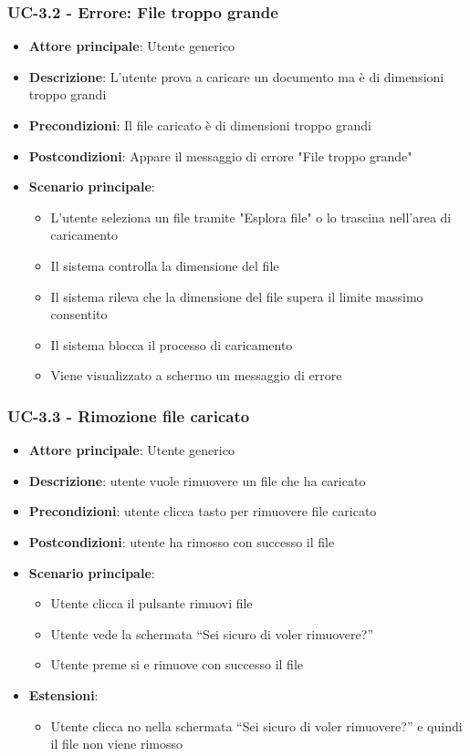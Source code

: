 \documentclass[11pt,a4paper]{article}
\begin{document}
\subsubsection{UC-3.2 - Errore: File troppo grande}
\begin{itemize}
    \item \textbf{Attore principale}: Utente generico
    \item \textbf{Descrizione}: L'utente prova a caricare un documento ma è di dimensioni troppo grandi
    \item \textbf{Precondizioni}: Il file caricato è di dimensioni troppo grandi
    \item \textbf{Postcondizioni}: Appare il messaggio di errore "File troppo grande"
    \item \textbf{Scenario principale}:
        \begin{itemize}
            \item L'utente seleziona un file tramite "Esplora file" o lo trascina nell'area di caricamento
            \item Il sistema controlla la dimensione del file
            \item Il sistema rileva che la dimensione del file supera il limite massimo consentito
            \item Il sistema blocca il processo di caricamento
            \item Viene visualizzato a schermo un messaggio di errore
        \end{itemize}
\end{itemize}

\subsubsection{UC-3.3 - Rimozione file caricato}
\begin{itemize}
    \item \textbf{Attore principale}: Utente generico
    \item \textbf{Descrizione}: utente vuole rimuovere un file che ha caricato
    \item \textbf{Precondizioni}: utente clicca tasto per rimuovere file caricato
    \item \textbf{Postcondizioni}: utente ha rimosso con successo il file
    \item \textbf{Scenario principale}:
        \begin{itemize}
            \item Utente clicca il pulsante rimuovi file
            \item Utente vede la schermata “Sei sicuro di voler rimuovere?”
            \item Utente preme si e rimuove con successo il file
        \end{itemize}
        \item \textbf{Estensioni}:
        \begin{itemize}
            \item Utente clicca no nella schermata “Sei sicuro di voler rimuovere?” e quindi il file non viene rimosso
        \end{itemize}
\end{itemize}
\end{document}
